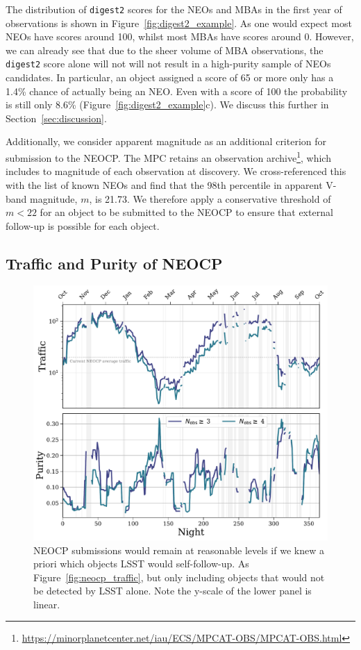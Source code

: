 \documentclass[twocolumn]{aastex631}
\newcommand{\dig}{\texttt{digest2}}
\begin{document}
The distribution of \dig{} scores for the NEOs and MBAs in the first year of observations is shown in Figure~\ref{fig:digest2_example}. As one would expect most NEOs have scores around 100, whilst most MBAs have scores around 0. However, we can already see that due to the sheer volume of MBA observations, the \dig{} score alone will not will not result in a high-purity sample of NEOs candidates. In particular, an object assigned a score of 65 or more only has a 1.4\% chance of actually being an NEO. Even with a score of 100 the probability is still only 8.6\% (Figure~\ref{fig:digest2_example}c). We discuss this further in Section~\ref{sec:discussion}.

Additionally, we consider apparent magnitude as an additional criterion for submission to the NEOCP. The MPC retains an observation archive\footnote{\url{https://minorplanetcenter.net/iau/ECS/MPCAT-OBS/MPCAT-OBS.html}}, which includes to magnitude of each observation at discovery. We cross-referenced this with the list of known NEOs and find that the 98th percentile in apparent V-band magnitude, $m$, is 21.73. We therefore apply a conservative threshold of $m < 22$ for an object to be submitted to the NEOCP to ensure that external follow-up is possible for each object.

\subsection{Traffic and Purity of NEOCP}\label{sec:traffic_basic}

\begin{figure}
    \centering
    \includegraphics[width=\textwidth]{traffic_purity_unfindable.pdf}
    \caption{NEOCP submissions would remain at reasonable levels if we knew a priori which objects LSST would self-follow-up. As Figure~\ref{fig:neocp_traffic}, but only including objects that would not be detected by LSST alone. Note the y-scale of the lower panel is linear.}
    \label{fig:neocp_traffic_unfindable}
\end{figure}
\end{document}

